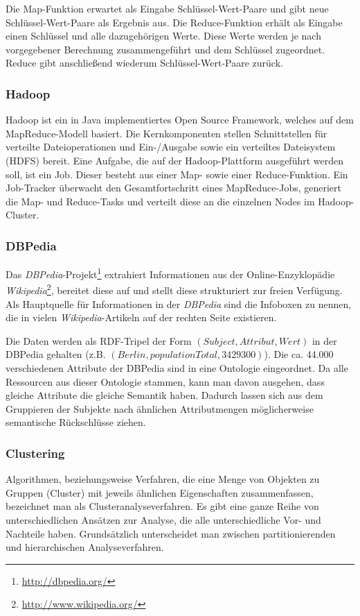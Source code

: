 \documentclass[a4paper]{llncs}
\begin{document}
Die Map-Funktion erwartet als Eingabe Schlüssel-Wert-Paare und gibt neue Schlüssel-Wert-Paare als Ergebnis aus.
Die Reduce-Funktion erhält als Eingabe einen Schlüssel und alle dazugehörigen Werte.
Diese Werte werden je nach vorgegebener Berechnung zusammengeführt und dem Schlüssel zugeordnet.
Reduce gibt anschließend wiederum Schlüssel-Wert-Paare zurück.

\subsubsection{Hadoop}
Hadoop ist ein in Java implementiertes Open Source Framework, welches auf dem MapReduce-Modell basiert.
Die Kernkomponenten stellen Schnittstellen für verteilte Dateioperationen und Ein-/Ausgabe sowie ein verteiltes Dateisystem (HDFS) bereit.
Eine Aufgabe, die auf der Hadoop-Plattform ausgeführt werden soll, ist ein Job.
Dieser besteht aus einer Map- sowie einer Reduce-Funktion.
Ein Job-Tracker überwacht den Gesamtfortschritt eines MapReduce-Jobs,
generiert die Map- und Reduce-Tasks und verteilt diese an die einzelnen Nodes im Hadoop-Cluster.

\subsubsection{DBPedia}
Das \emph{DBPedia}-Projekt\footnote{\url{http://dbpedia.org/}} extrahiert Informationen aus der Online-Enzyklopädie \emph{Wikipedia}\footnote{\url{http://www.wikipedia.org/}}, bereitet diese auf und stellt diese strukturiert zur freien Verfügung.
Als Hauptquelle für Informationen in der \emph{DBPedia} sind die Infoboxen zu nennen, die in vielen \emph{Wikipedia}-Artikeln auf der rechten Seite existieren.

Die Daten werden als RDF-Tripel der Form $(Subject, Attribut, Wert)$ in der DBPedia gehalten (z.B. $(Berlin, populationTotal, 3429300)$).
Die ca. 44.000 verschiedenen Attribute der DBPedia sind in eine Ontologie eingeordnet.
Da alle Ressourcen aus dieser Ontologie stammen, kann man davon ausgehen, dass gleiche Attribute die gleiche Semantik haben. Dadurch lassen sich aus dem Gruppieren der Subjekte nach ähnlichen Attributmengen möglicherweise semantische Rückschlüsse ziehen.

\subsubsection{Clustering}
Algorithmen, beziehungsweise Verfahren, die eine Menge von Objekten zu Gruppen (Cluster) mit jeweils ähnlichen Eigenschaften zusammenfassen, bezeichnet man als Clusteranalyseverfahren.
Es gibt eine ganze Reihe von unterschiedlichen Ansätzen zur Analyse, die alle unterschiedliche Vor- und Nachteile haben.
Grundsätzlich unterscheidet man zwischen partitionierenden und hierarchischen Analyseverfahren.
\end{document}
